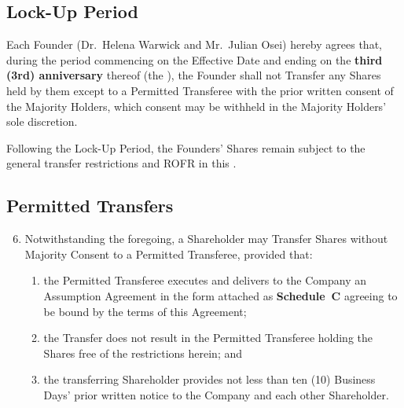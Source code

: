 \subsection{Lock-Up Period}

\begin{tcolorbox}[goldbox, title={Founder Lock-Up Restriction}]
  Each Founder (Dr.\ Helena Warwick and Mr.\ Julian Osei) hereby agrees that,
  during the period commencing on the Effective Date and ending on the
  \textbf{third (3rd) anniversary} thereof (the ), the
  Founder shall not Transfer any Shares held by them except to a Permitted
  Transferee with the prior written consent of the Majority Holders, which consent
  may be withheld in the Majority Holders' sole discretion.

  \medskip
  \noindent
  Following the Lock-Up Period, the Founders' Shares remain subject to the
  general transfer restrictions and ROFR in this .
\end{tcolorbox}

\subsection{Permitted Transfers}

\begin{enumerate}[leftmargin=*, label=\textbf{6.\arabic*.}, itemsep=5pt]
  \setcounter{enumi}{5}
  \item Notwithstanding the foregoing, a Shareholder may Transfer Shares without
        Majority Consent to a Permitted Transferee, provided that:
        \begin{enumerate}[label=\lbrack\alph*\rbrack, leftmargin=2em, itemsep=2pt]
          \item the Permitted Transferee executes and delivers to the Company an
                Assumption Agreement in the form attached as \textbf{Schedule~C}
                agreeing to be bound by the terms of this Agreement;
          \item the Transfer does not result in the Permitted Transferee holding
                the Shares free of the restrictions herein; and
          \item the transferring Shareholder provides not less than ten (10)
                Business Days' prior written notice to the Company and each other
                Shareholder.
        \end{enumerate}
\end{enumerate}

